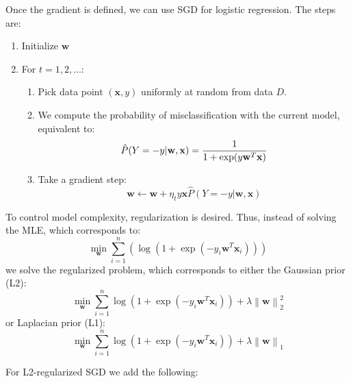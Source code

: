 \documentclass[a4paper,10pt,twoside]{article}
\newcommand\norm[1]{\left\lVert#1\right\rVert}
\begin{document}
Once the gradient is defined, we can use SGD for logistic regression. The steps are:
\begin{enumerate}
  \item Initialize $\mathbf{w}$
  \item For $t=1,2,\ldots$:
    \begin{enumerate}
    \item Pick data point $(\mathbf{x},y)$ uniformly at random from data $D$.
    \item We compute the probability of misclassification with the current model, equivalent to:
        \begin{equation*}
          \hat{P}(Y=-y|\mathbf{w},\mathbf{x}) = {1\over 1+\exp(y\mathbf{w}^T\mathbf{x})}
        \end{equation*}
     \item Take a gradient step:
       \begin{equation*}
         \mathbf{w}\leftarrow\mathbf{w}+\eta_ty\mathbf{x}\hat{P}(Y=-y|\mathbf{w},\mathbf{x})
       \end{equation*}
    \end{enumerate}
\end{enumerate}

To control model complexity, regularization is desired. Thus, instead of solving the MLE, which corresponds to:
\begin{equation*}
  \min_{\mathbf{w}}\sum_{i=1}^n(\log(1+\exp(-y_i\mathbf{w}^T\mathbf{x}_i)))
\end{equation*}
we solve the regularized problem, which corresponds to either the Gaussian prior (L2):
\begin{equation*}
  \min_{\mathbf{w}}\sum_{i=1}^n\log(1+\exp(-y_i\mathbf{w}^T\mathbf{x}_i))+\lambda\norm{\mathbf{w}}_2^2
\end{equation*}
or Laplacian prior (L1):
\begin{equation*}
  \min_{\mathbf{w}}\sum_{i=1}^n\log(1+\exp(-y_i\mathbf{w}^T\mathbf{x}_i))+\lambda\norm{\mathbf{w}}_1
\end{equation*}

For L2-regularized SGD we add the following:
\end{document}
